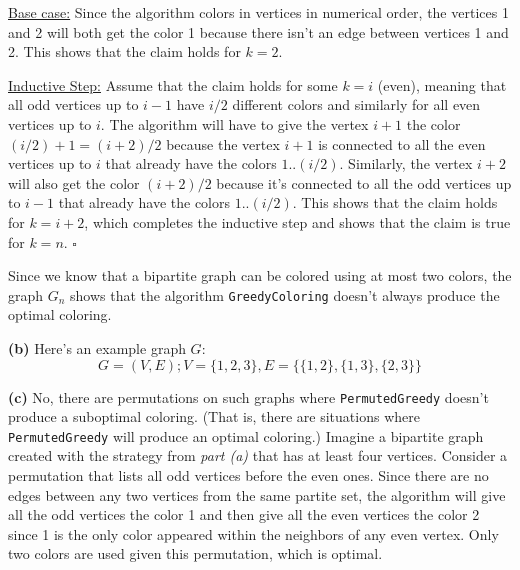 \documentclass{article}
\begin{document}
\begin{enumerate}
\begin{itemize}
        \underline{Base case:} Since the algorithm colors in vertices in numerical order, the vertices 1 and 2 will both get the color 1 because there isn't an edge between vertices 1 and 2. This shows that the claim holds for $k = 2$.

        \underline{Inductive Step:} Assume that the claim holds for some $k = i$ (even), meaning that all odd vertices up to $i-1$ have $i/2$ different colors and similarly for all even vertices up to $i$. The algorithm will have to give the vertex $i+1$ the color $(i/2) + 1 = (i+2)/2$ because the vertex $i+1$ is connected to all the even vertices up to $i$ that already have the colors $1..(i/2)$. Similarly, the vertex $i+2$ will also get the color $(i+2)/2$ because it's connected to all the odd vertices up to $i-1$ that already have the colors $1..(i/2)$. This shows that the claim holds for $k = i+2$, which completes the inductive step and shows that the claim is true for $k = n$. $\square$
    \end{itemize}
    Since we know that a bipartite graph can be colored using at most two colors, the graph $G_n$ shows that the algorithm \texttt{GreedyColoring} doesn't always produce the optimal coloring.

    \textbf{(b)} Here's an example graph $G$:
    $$G = (V, E); V = \{1, 2, 3\}, E = \{\{1, 2\}, \{1, 3\}, \{2, 3\}\}$$

    \textbf{(c)} No, there are permutations on such graphs where \texttt{PermutedGreedy} doesn't produce a suboptimal coloring. (That is, there are situations where \texttt{PermutedGreedy} will produce an optimal coloring.) Imagine a bipartite graph created with the strategy from \textit{part (a)} that has at least four vertices. Consider a permutation that lists all odd vertices before the even ones. Since there are no edges between any two vertices from the same partite set, the algorithm will give all the odd vertices the color 1 and then give all the even vertices the color 2 since 1 is the only color appeared within the neighbors of any even vertex. Only two colors are used given this permutation, which is optimal.

\end{enumerate}
\end{document}
